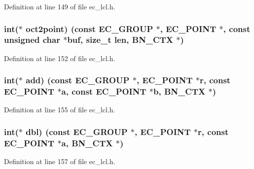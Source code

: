 Definition at line 149 of file ec\+\_\+lcl.\+h.

\subsubsection[{\texorpdfstring{oct2point}{oct2point}}]{\setlength{\rightskip}{0pt plus 5cm}int($\ast$ oct2point) (const {\bf E\+C\+\_\+\+G\+R\+O\+UP} $\ast$, {\bf E\+C\+\_\+\+P\+O\+I\+NT} $\ast$, const unsigned char $\ast$buf, size\+\_\+t {\bf len}, {\bf B\+N\+\_\+\+C\+TX} $\ast$)}\hypertarget{structec__method__st_aef8f4d22677de3a1153965d0970427f0}{}\label{structec__method__st_aef8f4d22677de3a1153965d0970427f0}


Definition at line 152 of file ec\+\_\+lcl.\+h.

\subsubsection[{\texorpdfstring{add}{add}}]{\setlength{\rightskip}{0pt plus 5cm}int($\ast$ add) (const {\bf E\+C\+\_\+\+G\+R\+O\+UP} $\ast$, {\bf E\+C\+\_\+\+P\+O\+I\+NT} $\ast$r, const {\bf E\+C\+\_\+\+P\+O\+I\+NT} $\ast${\bf a}, const {\bf E\+C\+\_\+\+P\+O\+I\+NT} $\ast$b, {\bf B\+N\+\_\+\+C\+TX} $\ast$)}\hypertarget{structec__method__st_a6641c298e46b4c381df31a3ec5fb3fa2}{}\label{structec__method__st_a6641c298e46b4c381df31a3ec5fb3fa2}


Definition at line 155 of file ec\+\_\+lcl.\+h.

\subsubsection[{\texorpdfstring{dbl}{dbl}}]{\setlength{\rightskip}{0pt plus 5cm}int($\ast$ dbl) (const {\bf E\+C\+\_\+\+G\+R\+O\+UP} $\ast$, {\bf E\+C\+\_\+\+P\+O\+I\+NT} $\ast$r, const {\bf E\+C\+\_\+\+P\+O\+I\+NT} $\ast${\bf a}, {\bf B\+N\+\_\+\+C\+TX} $\ast$)}\hypertarget{structec__method__st_a96a9d089b91bc3976a8c831388b24620}{}\label{structec__method__st_a96a9d089b91bc3976a8c831388b24620}


Definition at line 157 of file ec\+\_\+lcl.\+h.

